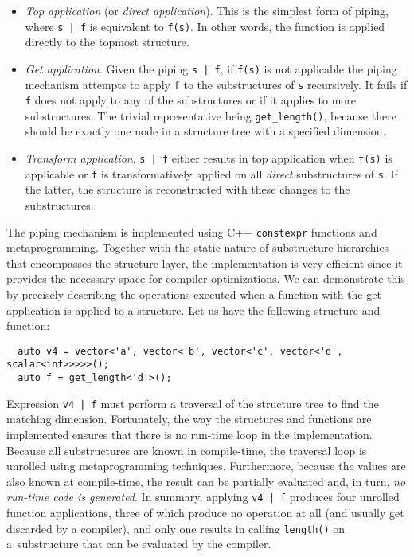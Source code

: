 \begin{itemize}
    \item \emph{Top application} (or \emph{direct application}). This is the simplest form of piping, where \texttt{s | f} is equivalent to \texttt{f(s)}. In other words, the function is applied directly to the topmost structure. 
    \item \emph{Get application}. Given the piping \texttt{s | f}, if \texttt{f(s)} is not applicable the piping mechanism attempts to apply \texttt{f} to the substructures of \texttt{s} recursively. It fails if \texttt{f} does not apply to any of the substructures or if it applies to more substructures. The trivial representative being \texttt{get\_length()}, because there should be exactly one node in a structure tree with a specified dimension.   
    \item \emph{Transform application}. \texttt{s | f} either results in top application when \texttt{f(s)} is applicable or \texttt{f} is transformatively applied on all \emph{direct} substructures of \texttt{s}. If the latter, the structure is reconstructed with these changes to the substructures. 
\end{itemize}

The piping mechanism is implemented using C++ \texttt{constexpr} functions and metaprogramming. Together with the static nature of substructure hierarchies that encompasses the structure layer, the implementation is very efficient since it provides the necessary space for compiler optimizations. We can demonstrate this by precisely describing the operations executed when a function with the get application is applied to a structure. Let us have the following structure and function:
\begin{verbatim}
  auto v4 = vector<'a', vector<'b', vector<'c', vector<'d', scalar<int>>>>>();
  auto f = get_length<'d'>();
\end{verbatim}
Expression \texttt{v4 | f} must perform a traversal of the structure tree to find the matching dimension. Fortunately, the way the structures and functions are implemented ensures that there is no run-time loop in the implementation. Because all substructures are known in compile-time, the traversal loop is unrolled using metaprogramming techniques. Furthermore, because the values are also known at compile-time, the result can be partially evaluated and, in turn, \emph{no run-time code is generated}. In summary, applying \texttt{v4 | f} produces four unrolled function applications, three of which produce no operation at all (and usually get discarded by a compiler), and only one results in calling \texttt{length()} on a~substructure that can be evaluated by the compiler.


